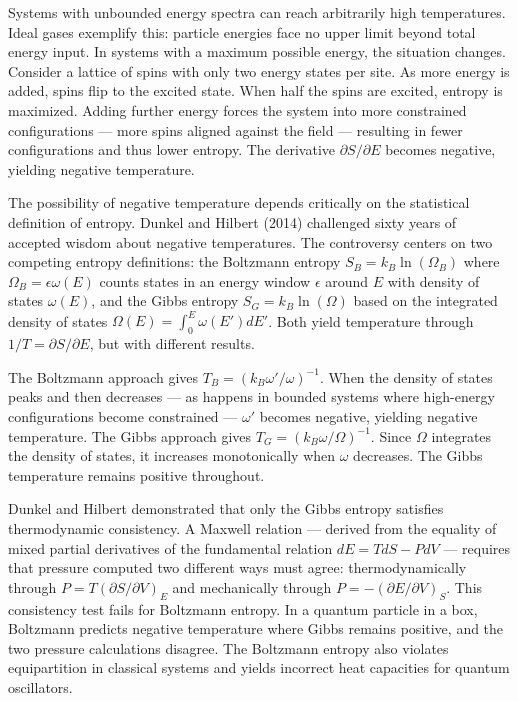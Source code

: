 Systems with unbounded energy spectra can reach arbitrarily high temperatures. Ideal gases exemplify this: particle energies face no upper limit beyond total energy input. In systems with a maximum possible energy, the situation changes. Consider a lattice of spins with only two energy states per site. As more energy is added, spins flip to the excited state. When half the spins are excited, entropy is maximized. Adding further energy forces the system into more constrained configurations — more spins aligned against the field — resulting in fewer configurations and thus lower entropy. The derivative $ \partial S/\partial E $ becomes negative, yielding negative temperature.

The possibility of negative temperature depends critically on the statistical definition of entropy. Dunkel and Hilbert (2014) challenged sixty years of accepted wisdom about negative temperatures. The controversy centers on two competing entropy definitions: the Boltzmann entropy $S_B = k_B \ln(\Omega_B)$ where $\Omega_B = \epsilon \omega(E)$ counts states in an energy window $\epsilon$ around $E$ with density of states $\omega(E)$, and the Gibbs entropy $S_G = k_B \ln(\Omega)$ based on the integrated density of states $\Omega(E) = \int_0^E \omega(E') dE'$. Both yield temperature through $1/T = \partial S/\partial E$, but with different results.

The Boltzmann approach gives $T_B = (k_B \omega'/\omega)^{-1}$. When the density of states peaks and then decreases — as happens in bounded systems where high-energy configurations become constrained — $\omega'$ becomes negative, yielding negative temperature. The Gibbs approach gives $T_G = (k_B \omega/\Omega)^{-1}$. Since $\Omega$ integrates the density of states, it increases monotonically when $\omega$ decreases. The Gibbs temperature remains positive throughout.

Dunkel and Hilbert demonstrated that only the Gibbs entropy satisfies thermodynamic consistency. A Maxwell relation — derived from the equality of mixed partial derivatives of the fundamental relation $dE = TdS - PdV$ — requires that pressure computed two different ways must agree: thermodynamically through $P = T(\partial S/\partial V)_E$ and mechanically through $P = -(\partial E/\partial V)_S$. This consistency test fails for Boltzmann entropy. In a quantum particle in a box, Boltzmann predicts negative temperature where Gibbs remains positive, and the two pressure calculations disagree. The Boltzmann entropy also violates equipartition in classical systems and yields incorrect heat capacities for quantum oscillators.

